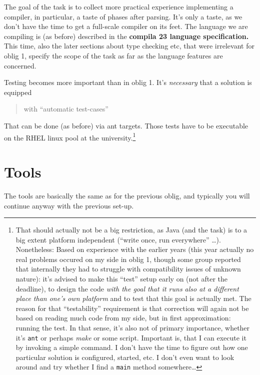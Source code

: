 \documentclass[11pt,freeform]{handout}[2014/08/13]
\begin{document}
The goal of the task is to collect more practical experience implementing a
compiler, in particular, a taste of phases after parsing. It's only a
taste, as we don't have the time to get a full-scale compiler on its
feet. The language we are compiling is (as before) described in the
\textbf{compila 23 language specification.} This time, also the later
sections about type checking etc, that were irrelevant for oblig 1, specify
the scope of the task as far as the language features are concerned.


Testing becomes more important than in oblig 1. It's \emph{necessary} that
a solution is equipped


\begin{quote}
  with ``automatic test-cases''
\end{quote}

That can be done (as before) via ant targets. Those tests have to be
executable on the RHEL linux pool at the university.\footnote{That should
  actually not be a big restriction, as Java (and the task) is to a big
  extent platform independent (``write once, run everywhere''
  \ldots). Nonetheless: Based on experience with the earlier years (this
  year actually no real problems occured on my side in oblig 1, though some
  group reported that internally they had to struggle with compatibility
  issues of unknown nature): it's advised to make this ``test'' setup early
  on (not after the deadline), to design the code \emph{with the goal that
    it runs also at a different place than one's own platform} and to test
  that this goal is actually met. The reason for that ``testability''
  requirement is that correction will again not be based on reading much
  code from my side, but in first approximation: running the test. In that
  sense, it's also not of primary importance, whether it's \texttt{ant} or
  perhaps \emph{make} or some script. Important is, that I can execute it
  by invoking a simple command.  I don't have the time to figure out how
  one particular solution is configured, started, etc. I don't even want to
  look around and try whether I find a \texttt{main} method somewhere\ldots
}


\section{Tools}


The tools are basically the same as for the previous oblig, and typically
you will continue anyway with the previous set-up. 
\end{document}
